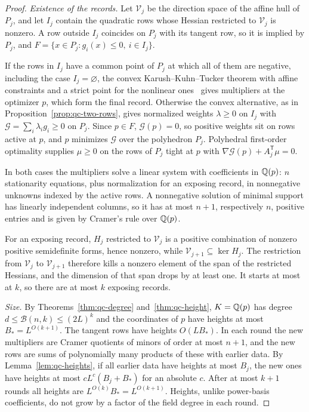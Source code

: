 \begin{proof}
\emph{Existence of the records.} Let $\mathcal V_j$ be the direction space of
the affine hull of $P_j$, and let $I_j$ contain the quadratic rows whose
Hessian restricted to $\mathcal V_j$ is nonzero. A row outside $I_j$
coincides on $P_j$ with its tangent row, so it is implied by $P_j$, and
$F=\{x\in P_j:g_i(x)\le0,\ i\in I_j\}$.

If the rows in $I_j$ have a common point of $P_j$ at which all of them are
negative, including the case $I_j=\varnothing$, the convex
Karush--Kuhn--Tucker theorem with affine constraints and a strict point for
the nonlinear ones~\cite{Rockafellar1970} gives multipliers at the optimizer
$p$, which form the final record. Otherwise the convex alternative, as in
Proposition~\ref{prop:qc-two-rows}, gives normalized weights $\lambda\ge0$ on
$I_j$ with $\mathcal G=\sum_i\lambda_ig_i\ge0$ on $P_j$. Since $p\in F$,
$\mathcal G(p)=0$, so positive weights sit on rows active at $p$, and $p$
minimizes $\mathcal G$ over the polyhedron $P_j$. Polyhedral first-order
optimality supplies $\mu\ge0$ on the rows of $P_j$ tight at $p$ with
$\nabla\mathcal G(p)+A_j^{\mathsf T}\mu=0$.

In both cases the multipliers solve a linear system with coefficients in
$\mathbb Q(p)$: $n$ stationarity equations, plus normalization for an exposing
record, in nonnegative unknowns indexed by the active rows. A nonnegative
solution of minimal support has linearly independent columns, so it has at
most $n+1$, respectively $n$, positive entries and is given by Cramer's rule
over $\mathbb Q(p)$.

For an exposing record, $H_j$ restricted to $\mathcal V_j$ is a positive
combination of nonzero positive semidefinite forms, hence nonzero, while
$\mathcal V_{j+1}\subseteq\ker H_j$. The restriction from $\mathcal V_j$ to
$\mathcal V_{j+1}$ therefore kills a nonzero element of the span of the
restricted Hessians, and the dimension of that span drops by at least one.
It starts at most at $k$, so there are at most $k$ exposing records.

\emph{Size.} By Theorems~\ref{thm:qc-degree} and~\ref{thm:qc-height},
$K=\mathbb Q(p)$ has degree $d\le\mathcal B(n,k)\le(2L)^k$ and the coordinates of $p$
have heights at most $B_*=L^{O(k+1)}$. The tangent rows have heights
$O(LB_*)$. In each round the new multipliers are Cramer quotients of minors of
order at most $n+1$, and the new rows are sums of polynomially many products
of these with earlier data. By Lemma~\ref{lem:qc-heights}, if all earlier data
have heights at most $B_j$, the new ones have heights at most
$cL^c(B_j+B_*)$ for an absolute $c$. After at most $k+1$ rounds all heights
are $L^{O(k)}B_*=L^{O(k+1)}$. Heights, unlike power-basis coefficients, do not
grow by a factor of the field degree in each round.


\end{proof}
